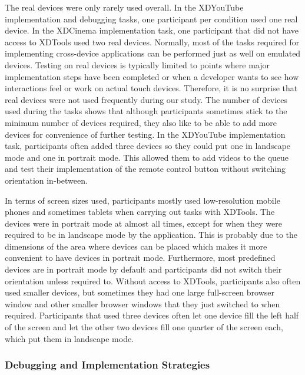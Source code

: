 The real devices were only rarely used overall. In the XDYouTube implementation and debugging tasks, one participant per condition used one real device. In the XDCinema implementation task, one participant that did not have access to XDTools used two real devices. Normally, most of the tasks required for implementing cross-device applications can be performed just as well on emulated devices. Testing on real devices is typically limited to points where major implementation steps have been completed or when a developer wants to see how interactions feel or work on actual touch devices. Therefore, it is no surprise that real devices were not used frequently during our study. The number of devices used during the tasks shows that although participants sometimes stick to the minimum number of devices required, they also like to be able to add more devices for convenience of further testing. In the XDYouTube implementation task, participants often added three devices so they could put one in landscape mode and one in portrait mode. This allowed them to add videos to the queue and test their implementation of the remote control button without switching orientation in-between. 

In terms of screen sizes used, participants mostly used low-resolution mobile phones and sometimes tablets when carrying out tasks with XDTools. The devices were in portrait mode at almost all times, except for when they were required to be in landscape mode by the application. This is probably due to the dimensions of the area where devices can be placed which makes it more convenient to have devices in portrait mode. Furthermore, most predefined devices are in portrait mode by default and participants did not switch their orientation unless required to. Without access to XDTools, participants also often used smaller devices, but sometimes they had one large full-screen browser window and other smaller browser windows that they just switched to when required. Participants that used three devices often let one device fill the left half of the screen and let the other two devices fill one quarter of the screen each, which put them in landscape mode. 

\subsubsection{Debugging and Implementation Strategies}

